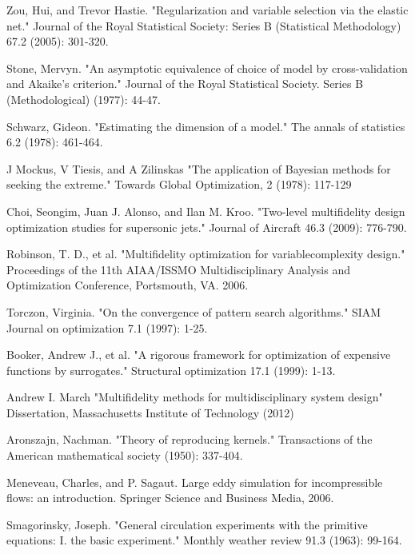 \documentclass[a4paper,onecolumn]{article}
\theoremstyle{remark}
\begin{document}
\begin{thebibliography}{9}
Zou, Hui, and Trevor Hastie. 
"Regularization and variable selection via the elastic net." 
Journal of the Royal Statistical Society: Series B (Statistical Methodology) 67.2 (2005): 301-320.

Stone, Mervyn. 
"An asymptotic equivalence of choice of model by cross-validation and Akaike's criterion." 
Journal of the Royal Statistical Society. Series B (Methodological) (1977): 44-47.

Schwarz, Gideon. 
"Estimating the dimension of a model." 
The annals of statistics 6.2 (1978): 461-464.

J Mockus, V Tiesis, and A Zilinskas
"The application of Bayesian methods for seeking the extreme."
Towards Global Optimization, 2 (1978): 117-129

Choi, Seongim, Juan J. Alonso, and Ilan M. Kroo. 
"Two-level multifidelity design optimization studies for supersonic jets." 
Journal of Aircraft 46.3 (2009): 776-790.


Robinson, T. D., et al. 
"Multifidelity optimization for variablecomplexity design."
Proceedings of the 11th AIAA/ISSMO Multidisciplinary Analysis and Optimization Conference, 
Portsmouth, VA. 2006.

Torczon, Virginia. 
"On the convergence of pattern search algorithms." 
SIAM Journal on optimization 7.1 (1997): 1-25.

Booker, Andrew J., et al. 
"A rigorous framework for optimization of expensive functions by surrogates." 
Structural optimization 17.1 (1999): 1-13.

Andrew I. March
"Multifidelity methods for multidisciplinary system design"
Dissertation, Massachusetts Institute of Technology (2012)

Aronszajn, Nachman. 
"Theory of reproducing kernels." 
Transactions of the American mathematical society (1950): 337-404.

Meneveau, Charles, and P. Sagaut. 
Large eddy simulation for incompressible flows: an introduction.
Springer Science and Business Media, 2006.

Smagorinsky, Joseph. 
"General circulation experiments with the primitive equations: I. the basic experiment." 
Monthly weather review 91.3 (1963): 99-164.


\end{thebibliography}
\end{document}
